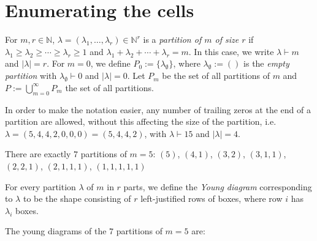 \section{Enumerating the cells}
\begin{definition} For $m,r\in\mathbb{N}$, $\lambda=(\lambda_1,\ldots,\lambda_r)\in\mathbb{N}^r$ is a \emph{partition of $m$ of size $r$} if $\lambda_1\geq\lambda_2\geq\cdots\geq\lambda_r\geq1$ and $\lambda_1+\lambda_2+\cdots+\lambda_r=m$. In this case, we write $\lambda\vdash m$ and $|\lambda|=r$. For $m=0$, we define $P_0:=\{\lambda_{\emptyset}\}$, where $\lambda_{\emptyset}:=()$ is the \emph{empty partition} with $\lambda_{\emptyset}\vdash0$ and $|\lambda|=0$. Let $P_m$ be the set of all partitions of $m$ and $P:=\bigcup_{m=0}^{\infty}P_m$ the set of all partitions.
\end{definition}
\begin{remark}
In order to make the notation easier, any number of trailing zeros at the end of a partition are allowed, without this affecting the size of the partition, i.e. $\lambda=(5,4,4,2,0,0,0)=(5,4,4,2)$, with $\lambda\vdash15$ and $|\lambda|=4$.
\end{remark}
\begin{example} There are exactly $7$ partitions of $m=5$:
$(5)$, $(4,1)$, $(3,2)$, $(3,1,1)$, $(2,2,1)$, $(2,1,1,1)$, $(1,1,1,1,1)$
\end{example}

\begin{notation} For every partition $\lambda$ of $m$ in $r$ parts, we define the \emph{Young diagram} corresponding to $\lambda$ to be the shape consisting of $r$ left-justified rows of boxes, where row $i$ has $\lambda_i$ boxes.
\end{notation}
\begin{example} The young diagrams of the $7$ partitions of $m=5$ are:
\begin{center}
\qquad{}\qquad{}\qquad{}\qquad{}\qquad{}\qquad{}
\end{center}
\end{example}

